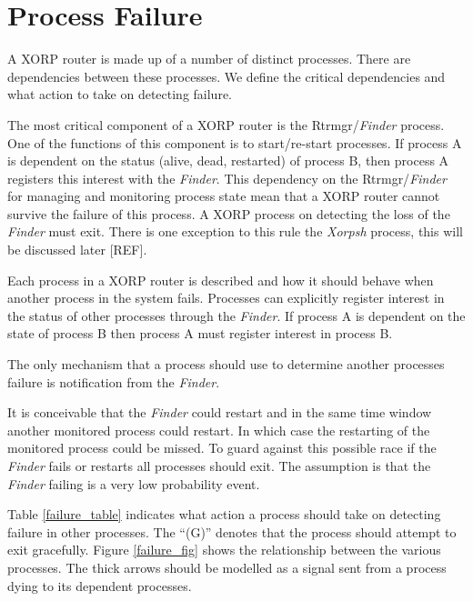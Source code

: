 \documentclass[11pt]{article}
\makeatletter
\newcommand{\finder} {{\em Finder}\@\xspace}
\newcommand{\xorpsh} {{\em Xorpsh}\@\xspace}
\makeatother
\begin{document}
\section{\label{pfailure}Process Failure}

A XORP router is made up of a number of distinct processes. There are
dependencies between these processes. We define the critical
dependencies and what action to take on detecting failure.

The most critical component of a XORP router is the Rtrmgr/\finder
process. One of the functions of this component is to start/re-start
processes. If process A is dependent on the status (alive, dead,
restarted) of process B, then process A registers this interest with
the \finder. This dependency on the Rtrmgr/\finder for managing and
monitoring process state mean that a XORP router cannot survive the
failure of this process. A XORP process on detecting the loss of the
\finder must exit. There is one exception to this rule the \xorpsh
process, this will be discussed later [REF].

Each process in a XORP router is described and how it should behave
when another process in the system fails. Processes can explicitly
register interest in the status of other processes through the
\finder. If process A is dependent on the state of process B then
process A must register interest in process B.

The only mechanism that a process should use to determine another
processes failure is notification from the \finder.

It is conceivable that the \finder could restart and in the same time
window another monitored process could restart. In which case the
restarting of the monitored process could be missed. To guard against
this possible race if the \finder fails or restarts all processes
should exit. The assumption is that the \finder failing is a very low
probability event.

Table \ref{failure_table} indicates what action a process should take
on detecting failure in other processes. The ``(G)'' denotes that the
process should attempt to exit gracefully. Figure \ref{failure_fig}
shows the relationship between the various processes. The thick arrows
should be modelled as a signal sent from a process dying to its
dependent processes.
\end{document}
